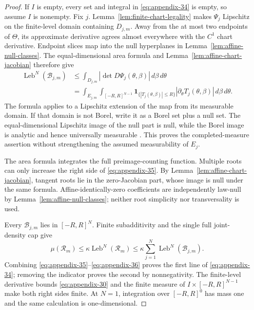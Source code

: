 \begin{proof}
If $I$ is empty, every set and integral in \eqref{eq:appendix-34} is empty, so assume $I$ is
nonempty.  Fix $j$.  Lemma~\ref{lem:finite-chart-legality} makes $\Psi_j$
Lipschitz on the finite-level domain containing $D_{j,m}$.  Away from the at
most two endpoints of $\Theta$, its approximate derivative agrees almost
everywhere with the $C^1$ chart derivative.  Endpoint slices map into the
null hyperplanes in Lemma~\ref{lem:affine-null-classes}.  The
equal-dimensional area formula \citep{federer1969gmt} and
Lemma~\ref{lem:affine-chart-jacobian} therefore give
\begin{equation}
\begin{aligned}
\operatorname{Leb}^N(\mathcal B_{j,m})
&\leq\int_{D_{j,m}}
 |\det D\Psi_j(\theta,\beta)|\,d\beta\,d\theta\\
&=\int_{E_{j,m}}\int_{[-R,R]^{N-1}}
 \mathbf1_{\{|T_j(\theta,\beta)|\leq R\}}
 |\partial_\theta T_j(\theta,\beta)|
 \,d\beta\,d\theta.
\end{aligned}
\label{eq:appendix-35}
\end{equation}
The formula applies to a Lipschitz extension of the map from its measurable
domain.  If that domain is not Borel, write it as a Borel set plus a null set.
The equal-dimensional Lipschitz image of the null part is null, while the
Borel image is analytic and hence universally measurable
\citep{bogachev2007measure}.  This proves the completed-measure assertion
without strengthening the assumed measurability of $E_j$.

The area formula integrates the full preimage-counting function.  Multiple
roots can only increase the right side of \eqref{eq:appendix-35}.  By
Lemma~\ref{lem:affine-chart-jacobian}, tangent roots lie in the zero-Jacobian
part, whose image is null under the same formula.  Affine-identically-zero
coefficients are independently law-null by
Lemma~\ref{lem:affine-null-classes}; neither root simplicity nor
transversality is used.

Every $\mathcal B_{j,m}$ lies in $[-R,R]^N$.  Finite subadditivity and the
single full joint-density cap give
\begin{equation}
\mu(\mathcal R_m)
\leq\kappa\operatorname{Leb}^N(\mathcal R_m)
\leq\kappa\sum_{j=1}^N\operatorname{Leb}^N(\mathcal B_{j,m}).
\label{eq:appendix-36}
\end{equation}
Combining \eqref{eq:appendix-35}--\eqref{eq:appendix-36} proves the first line of \eqref{eq:appendix-34}; removing the
indicator proves the second by nonnegativity.  The finite-level derivative
bounds \eqref{eq:appendix-30} and the finite measure of
$I\times[-R,R]^{N-1}$ make both right sides finite.  At $N=1$, integration
over $[-R,R]^0$ has mass one and the same calculation is one-dimensional.
\end{proof}

